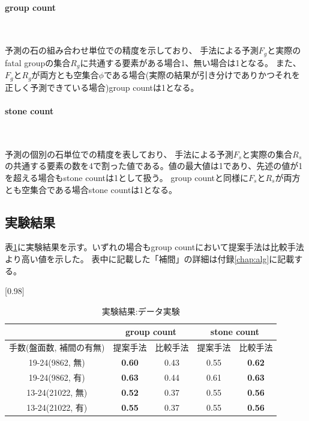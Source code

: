 \paragraph{group count}~
\par 予測の石の組み合わせ単位での精度を示しており、
手法による予測$F_g$と実際のfatal groupの集合$R_g$に共通する要素がある場合1、無い場合は1となる。
また、$F_g$と$R_g$が両方とも空集合$\phi$である場合(実際の結果が引き分けでありかつそれを正しく予測できている場合)group countは1となる。
\paragraph{stone count}~
\par 予測の個別の石単位での精度を表しており、
手法による予測$F_s$と実際の集合$R_s$の共通する要素の数を4で割った値である。値の最大値は1であり、先述の値が1を超える場合もstone countは1として扱う。
group countと同様に$F_s$と$R_s$が両方とも空集合である場合stone countは1となる。
\subsection{実験結果}


表\ref{table:result-online}に実験結果を示す。いずれの場合もgroup countにおいて提案手法は比較手法より高い値を示した。
表中に記載した「補間」の詳細は付録\ref{chap:alg}に記載する。
\begin{table}[H]
	\caption{実験結果:データ実験}
	\centering
	\scalebox{0.98}[0.98]{
		\begin{tabular}{c|c|c|c|c}
			\multicolumn{1}{c}{} & \multicolumn{2}{|c|}{group count} 
			& \multicolumn{2}{c|}{stone count}\\ \hline \hline
			手数(盤面数, 補間の有無)    & 提案手法 & 比較手法 & 提案手法 & 比較手法 \\ \hline
			19-24(9862, 無)    & \bf{0.60} & 0.43 & 0.55 & \bf{0.62} \\
			19-24(9862, 有)    & \bf{0.63} & 0.44 & 0.61 & \bf{0.63}  \\
			13-24(21022, 無)   & \bf{0.52} & 0.37 & 0.55 & \bf{0.56}  \\
			13-24(21022, 有)   & \bf{0.55} & 0.37 & 0.55 & \bf{0.56}  \\
		\end{tabular}
	}
	\label{table:result-online}
\end{table}
